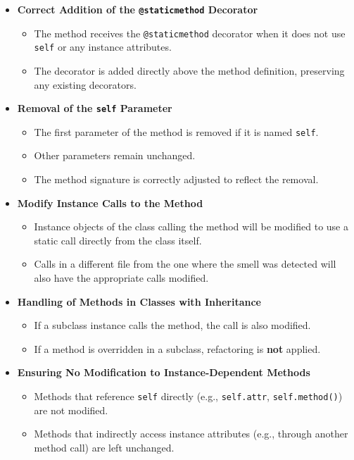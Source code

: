 \documentclass[12pt, titlepage]{article}
\begin{document}
  \begin{itemize}
    \item \textbf{Correct Addition of the \texttt{@staticmethod} Decorator}
      \begin{itemize}
        \item The method receives the \texttt{@staticmethod}
          decorator when it does not use \texttt{self} or any
          instance attributes.
        \item The decorator is added directly above the method
          definition, preserving any existing decorators.
      \end{itemize}

    \item \textbf{Removal of the \texttt{self} Parameter}
      \begin{itemize}
        \item The first parameter of the method is removed if it is
          named \texttt{self}.
        \item Other parameters remain unchanged.
        \item The method signature is correctly adjusted to reflect the removal.
      \end{itemize}

    \item \textbf{Modify Instance Calls to the Method}
      \begin{itemize}
        \item Instance objects of the class calling the method will
          be modified to use a static call directly from the class itself.
        \item Calls in a different file from the one where the smell
          was detected will also have the appropriate calls modified.
      \end{itemize}

    \item \textbf{Handling of Methods in Classes with Inheritance}
      \begin{itemize}
        \item If a subclass instance calls the method, the call is
          also modified.
        \item If a method is overridden in a subclass, refactoring is
          \textbf{not} applied.
      \end{itemize}

    \item \textbf{Ensuring No Modification to Instance-Dependent Methods}
      \begin{itemize}
        \item Methods that reference \texttt{self} directly (e.g.,
          \texttt{self.attr}, \texttt{self.method()}) are not modified.
        \item Methods that indirectly access instance attributes
          (e.g., through another method call) are left unchanged.
      \end{itemize}


\end{itemize}
\end{document}
